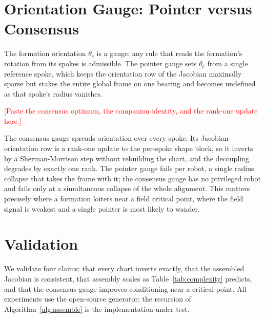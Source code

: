 \documentclass[conference]{IEEEtran}
\newcommand{\fillnote}[1]{\textcolor{red}{[#1]}} %
\begin{document}
\section{Orientation Gauge: Pointer versus Consensus}
\label{sec:gauge}

The formation orientation $\theta_c$ is a gauge: any rule that reads the
formation's rotation from its spokes is admissible. The pointer gauge sets
$\theta_c$ from a single reference spoke, which keeps the orientation row of the
Jacobian maximally sparse but stakes the entire global frame on one bearing and
becomes undefined as that spoke's radius vanishes.

\fillnote{Paste the consensus optimum, the companion identity, and the rank-one
update here.}

The consensus gauge spreads orientation over every spoke. Its Jacobian
orientation row is a rank-one update to the per-spoke shape block, so it inverts
by a Sherman-Morrison step \cite{7} without rebuilding the chart, and the
decoupling degrades by exactly one rank. The pointer gauge fails per robot, a
single radius collapse that takes the frame with it; the consensus gauge has no
privileged robot and fails only at a simultaneous collapse of the whole
alignment. This matters precisely where a formation loiters near a field critical
point, where the field signal is weakest and a single pointer is most likely to
wander.

\section{Validation}
\label{sec:validation}

We validate four claims: that every chart inverts exactly, that the assembled
Jacobian is consistent, that assembly scales as Table~\ref{tab:complexity}
predicts, and that the consensus gauge improves conditioning near a critical
point. All experiments use the open-source generator; the recursion of
Algorithm~\ref{alg:assemble} is the implementation under test.
\end{document}
